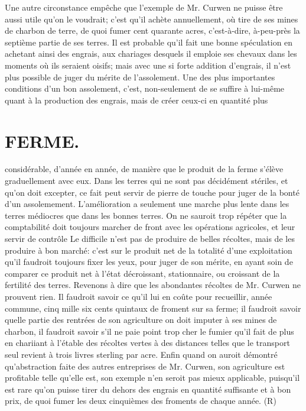 Une autre circonstance empêche que l'exemple de Mr. Curwen ne puisse être aussi utile qu'on le voudrait; c'est qu'il achète annuellement, où tire de ses mines de charbon de terre, de quoi fumer cent quarante acres, c'est-à-dire, à-peu-près la septième partie de ses terres. Il est probable qu'il fait une bonne spéculation en achetant ainsi des engrais, aux chariages desquels il emploie ses chevaux dans les moments où ils seraient oisifs; mais avec une si forte addition d'engrais, il n'est plus possible de juger du mérite de l'assolement. Une des plus importantes conditions d'un bon assolement, c'est, non-seulement de se suffire à lui-même quant à la production des engrais, mais de créer ceux-ci en quantité plus\setcounter{page}{223} \section{FERME.}
considérable, d’année en année, de manière que le produit de la ferme s’élève graduellement avec eux. Dans les terres qui ne sont pas décidément stériles, et qu’on doit excepter, ce fait peut servir de pierre de touche pour juger de la bonté d’un assolemement. L’amélioration a seulement une marche plus lente dans les terres médiocres que dans les bonnes terres. On ne sauroit trop répéter que la comptabilité doit toujours marcher de front avec les opérations agricoles, et leur servir de contrôle Le difficile n’est pas de produire de belles récoltes, mais de les produire à bon marché: c’est sur le produit net de la totalité d’une exploitation qu’il faudroit toujours fixer les yeux, pour juger de son mérite, en ayant soin de comparer ce produit net à l’état décroissant, stationnaire, ou croissant de la fertilité des terres. Revenons à dire que les abondantes récoltes de Mr. Curwen ne prouvent rien. Il faudroit savoir ce qu’il lui en coûte pour recueillir, année commune, cinq mille six cents quintaux de froment sur sa ferme; il faudroit savoir quelle partie des rentrées de son agriculture on doit imputer à ses mines de charbon, il faudroit savoir s’il ne paie point trop cher le fumier qu’il fait de plus en chariiant à l’étable des récoltes vertes à des distances telles que le transport seul revient à trois livres sterling par acre. Enfin quand on auroit démontré qu’abstraction faite des autres entreprises de Mr. Curwen, son agriculture est profitable telle qu’elle est, son exemple n’en seroit pas mieux applicable, puisqu’il est rare qu’on puisse tirer du dehors des engrais en quantité suffisante et à bon prix, de quoi fumer les deux cinquièmes des froments de chaque année. (R)